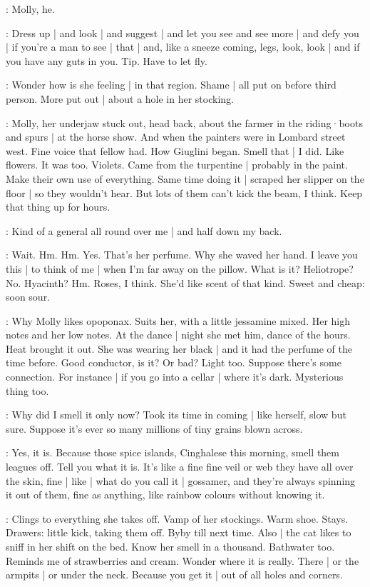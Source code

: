 \BloomToday:
Molly,
he.

\BloomAbstract:
Dress up |
and look |
and suggest |
and let you see and see more |
and defy you |
if you're a man to see |
that |
and,
like a sneeze coming,
legs,
look,
look |
and if you have any guts in you.
Tip.
Have to let fly.

\BloomCurrent:
Wonder how is she feeling |
in that region.
Shame |
all put on before third person.
More put out |
about a hole in her stocking.

\BloomHist:
Molly,
her underjaw stuck out,
head back,
about the farmer in the riding·boots and spurs |
at the horse show.%
And when the painters were in Lombard street west.
Fine voice that fellow had.
How Giuglini began.
Smell that |
I did.
Like flowers.
It was too.
Violets.
Came from the turpentine |
probably in the paint.
Make their own use of everything.
Same time doing it |
scraped her slipper on the floor |
so they wouldn't hear.
But lots of them can't kick the beam,
I think.
Keep that thing up for hours.

\BloomCurrent:
Kind of a general all round over me |
and half down my back.

\BloomCurrent:
Wait.
Hm.
Hm.
Yes.
That's her perfume.
Why she waved her hand.
I leave you this |
to think of me |
when I'm far away on the pillow.
What is it?
Heliotrope?
No.
Hyacinth?
Hm.
Roses,
I think.
She'd like scent of that kind.
Sweet and cheap:
soon sour.%

\BloomHist:
Why Molly likes opoponax.
Suits her,
with a little jessamine mixed.
Her high notes and her low notes.
At the dance |
night she met him,
dance of the hours.
Heat brought it out.
She was wearing her black |
and it had the perfume of the time before.
Good conductor,
is it?
Or bad?
Light too.
Suppose there's some connection.
For instance |
if you go into a cellar |
where it's dark.
Mysterious thing too.

\BloomCurrent:
Why did I smell it only now?
Took its time in coming |
like herself,
slow but sure.
Suppose it's ever so many millions of tiny grains blown across.

\BloomAbstract:
Yes,
it is.
Because those spice islands,
Cinghalese this morning,
smell them leagues off.
Tell you what it is.
It's like a fine fine veil
or web they have
all over the skin,
fine |
like |
what do you call it |
gossamer,%
and they're always spinning it out of them,
fine as anything,
like rainbow colours
without knowing it.

\BloomHist:
Clings to everything she takes off.
Vamp of her stockings.
Warm shoe.
Stays.
Drawers:
little kick,
taking them off.
Byby till next time.
Also |
the cat likes to sniff in her shift
on the bed.
Know her smell in a thousand.
Bathwater too.
Reminds me of strawberries and cream.
Wonder where it is really.
There |
or the armpits |
or under the neck.
Because you get it |
out of all holes and corners.

